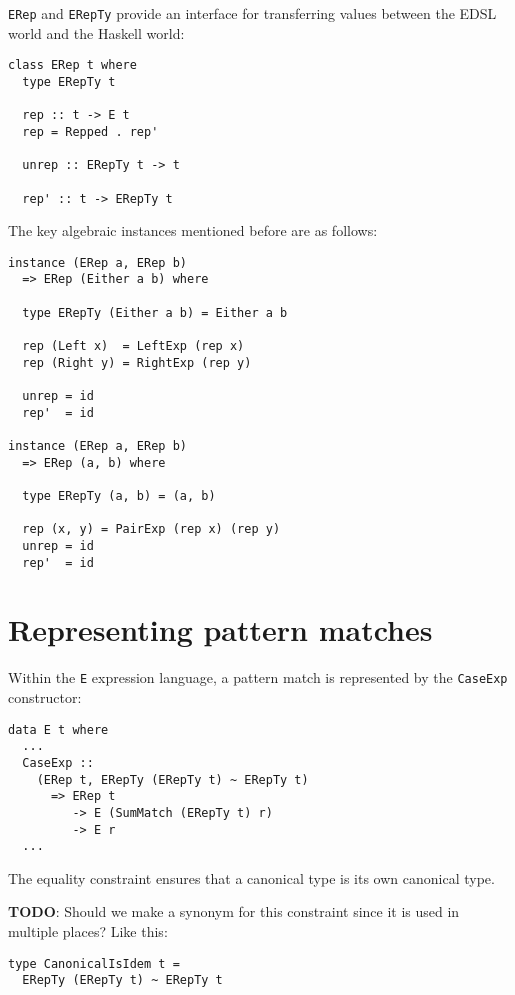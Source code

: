 \documentclass[sigplan,screen]{acmart}
\newcommand{\ttt}{\texttt}
\begin{document}
\ttt{ERep} and \ttt{ERepTy} provide an interface for transferring values between the EDSL
world and the Haskell world:

\begin{lstlisting}
class ERep t where
  type ERepTy t

  rep :: t -> E t
  rep = Repped . rep'

  unrep :: ERepTy t -> t

  rep' :: t -> ERepTy t
\end{lstlisting}

The key algebraic instances mentioned before are as follows:

\begin{lstlisting}
instance (ERep a, ERep b)
  => ERep (Either a b) where

  type ERepTy (Either a b) = Either a b

  rep (Left x)  = LeftExp (rep x)
  rep (Right y) = RightExp (rep y)

  unrep = id
  rep'  = id

instance (ERep a, ERep b)
  => ERep (a, b) where

  type ERepTy (a, b) = (a, b)

  rep (x, y) = PairExp (rep x) (rep y)
  unrep = id
  rep'  = id
\end{lstlisting}


\section{Representing pattern matches}

Within the \ttt{E} expression language, a pattern match is represented by the
\ttt{CaseExp} constructor:

\begin{lstlisting}
data E t where
  ...
  CaseExp ::
    (ERep t, ERepTy (ERepTy t) ~ ERepTy t)
      => ERep t
         -> E (SumMatch (ERepTy t) r)
         -> E r
  ...
\end{lstlisting}

The equality constraint ensures that a canonical type is its own canonical type.

\begin{tcolorbox}
  \textbf{TODO}: Should we make a synonym for this constraint since it is used in
multiple places? Like this:
\begin{lstlisting}
type CanonicalIsIdem t =
  ERepTy (ERepTy t) ~ ERepTy t
\end{lstlisting}
\end{tcolorbox}
\end{document}
